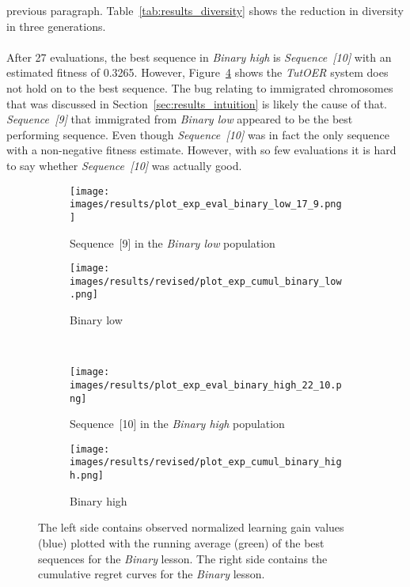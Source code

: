 previous paragraph. Table~\ref{tab:results_diversity} shows the reduction in
diversity in three generations.\\\\
\noindent
After 27 evaluations, the best sequence in \emph{Binary high} is
\emph{Sequence~[10]} with an estimated fitness of 0.3265. However,
Figure~\ref{fig:exp_cumul_binary_high} shows the \emph{TutOER} system does
not hold on to the best sequence. The bug relating to immigrated chromosomes
that was discussed in Section~\ref{sec:results_intuition} is likely the cause
of that. \emph{Sequence~[9]} that immigrated from \emph{Binary low} appeared to
be the best performing sequence. Even though \emph{Sequence~[10]} was in fact
the only sequence with a non-negative fitness estimate. However, with so few
evaluations it is hard to say whether \emph{Sequence~[10]} was actually good.

\begin{figure}[ht]
	\centering
	\begin{subfigure}{0.6\linewidth}
	\centering
	\texttt{[image: images/results/plot\_exp\_eval\_binary\_low\_17\_9.png]}
	\caption{Sequence~[9] in the \emph{Binary low} population}
	\label{fig:exp_eval_binary_low_17}
	\end{subfigure}
	\hfill
	\begin{subfigure}{0.39\linewidth}
	\centering
	\texttt{[image: images/results/revised/plot\_exp\_cumul\_binary\_low.png]}
	\caption{Binary low}
	\label{fig:exp_cumul_binary_low}
	\end{subfigure}\\
	\begin{subfigure}{0.6\linewidth}
	\centering
	\texttt{[image: images/results/plot\_exp\_eval\_binary\_high\_22\_10.png]}
	\caption{Sequence~[10] in the \emph{Binary high} population}
	\label{fig:exp_eval_binary_high_10}
	\end{subfigure}
	\hfill
	\begin{subfigure}{0.39\linewidth}
	\centering
	\texttt{[image: images/results/revised/plot\_exp\_cumul\_binary\_high.png]}
	\caption{Binary high}
	\label{fig:exp_cumul_binary_high}
	\end{subfigure}
	\caption[Evaluations of best sequences and cumulative regret in
	Binary]{The left side contains observed normalized learning gain values
		(blue) plotted with the running average (green) of the best sequences
		for the \emph{Binary} lesson. The right side contains the cumulative
		regret curves for the \emph{Binary} lesson.}
	\label{fig:exp_eval_binary}
\end{figure}

